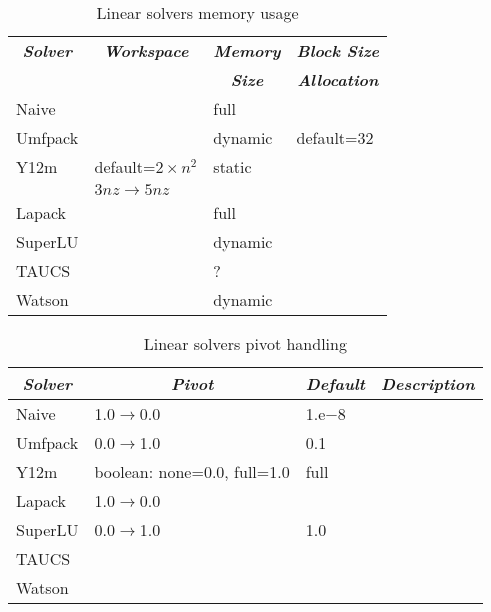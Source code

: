 \begin{table}
\centering
\caption{Linear solvers memory usage}\label{tab:linear-solvers-memory}
\begin{tabular}{llll}
\hline
	\multicolumn{1}{c}{\textbf{\emph{Solver}}} &
	\multicolumn{1}{c}{\textbf{\emph{Workspace}}} &
	\multicolumn{1}{c}{\textbf{\emph{Memory}}} &
	\multicolumn{1}{c}{\textbf{\emph{Block Size}}} \\
	&
	&
	\multicolumn{1}{c}{\textbf{\emph{Size}}} &
	\multicolumn{1}{c}{\textbf{\emph{Allocation}}} \\
\hline\hline
	Naive		& 			& full		&		\\
	Umfpack 	& 			& dynamic	& default=32	\\
	Y12m 		& default=$2\times{n^2}$& static	&		\\
			& $3nz \rightarrow 5nz$	&		&		\\
	Lapack		&			& full		&		\\
	SuperLU		& 			& dynamic 	&		\\
	TAUCS		&			& ?		&		\\
	Watson		&			& dynamic	&		\\
\hline
\end{tabular}
\end{table}

\begin{table}
\centering
\caption{Linear solvers pivot handling}\label{tab:linear-solvers-pivot}
\begin{tabular}{llll}
\hline
	\multicolumn{1}{c}{\textbf{\emph{Solver}}} &
	\multicolumn{1}{c}{\textbf{\emph{Pivot}}} &
	\multicolumn{1}{c}{\textbf{\emph{Default}}} &
	\multicolumn{1}{c}{\textbf{\emph{Description}}} \\
\hline\hline
	Naive		& 1.0$\rightarrow$0.0		& 1.e$-8$	& \\
	Umfpack 	& 0.0$\rightarrow$1.0 		& 0.1 		& \\
	Y12m 		& boolean: none=0.0, full=1.0	& full		& \\
	Lapack		& 1.0$\rightarrow$0.0		&		& \\
	SuperLU		& 0.0$\rightarrow$1.0		& 1.0		& \\
	TAUCS		&				&		& \\
	Watson		&				&		& \\
\hline
\end{tabular}
\end{table}



